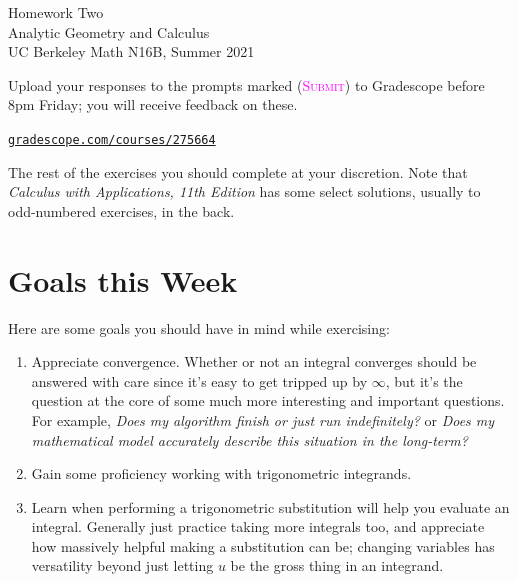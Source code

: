 

\usepackage{fourier}



\pagestyle{empty}




\begin{center}
    {\Huge{Homework Two}}
    \\ \footnotesize{Analytic Geometry and Calculus}
    \\ \footnotesize{UC Berkeley Math N16B, Summer 2021}
\end{center}
\vspace{2em}

Upload your responses to the prompts marked
(\textsc{\textcolor{magenta}{Submit}})
to Gradescope before 8pm Friday; 
you will receive feedback on these.
\begin{center}
    \href{https://www.gradescope.com/courses/275664}%
    {\texttt{gradescope.com/courses/275664}}
\end{center}
The rest of the exercises you should complete at your discretion.
Note that \emph{Calculus with Applications, 11th Edition} 
has some select solutions, usually to odd-numbered exercises, in the back.


\section*{Goals this Week}

Here are some goals you should have in mind while exercising:
\begin{enumerate}
    \item 
        Appreciate convergence.
        Whether or not an integral converges 
        should be answered with care
        since it's easy to get tripped up by $\infty$,
        but it's the question at the core 
        of some much more interesting and important questions. For example, 
        \emph{Does my algorithm finish or just run indefinitely?} or
        \emph{Does my mathematical model accurately describe this situation in the long-term?}
    \item 
        Gain some proficiency working with trigonometric integrands.
    \item 
        Learn when performing a trigonometric substitution will help you
        evaluate an integral. Generally just practice taking more integrals too,
        and appreciate how massively helpful making a substitution can be;
        changing variables has versatility beyond just letting $u$ 
        be the gross thing in an integrand.
\end{enumerate}
\newpage


